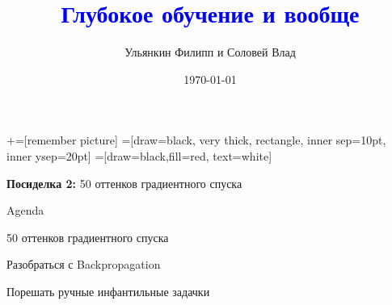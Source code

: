 \documentclass[notes,12pt, aspectratio=169]{beamer}
\title[]{\textcolor{blue}{Глубокое обучение и вообще}}
\author{Ульянкин Филипп и Соловей Влад}
\date{\today}
\newenvironment{wideitemize}{\itemize\addtolength{\itemsep}{10pt}}{\enditemize}
\begin{document}
\newcommand\marktopleft[1]{%
    \tikz[overlay,remember picture] 
        \node (marker-#1-a) at (-.3em,.3em) {};%
}
\newcommand\markbottomright[2]{%
    \tikz[overlay,remember picture] 
        \node (marker-#1-b) at (0em,0em) {};%
}
+=[remember picture] 
 =[draw=black, very thick, rectangle, inner sep=10pt, inner ysep=20pt]
 =[draw=black,fill=red, text=white]


\begin{frame}
\maketitle
\centering \textbf{\color{blue} Посиделка 2:}  50 оттенков градиентного спуска
\end{frame}

\begin{frame}{Agenda}
\begin{wideitemize}
	
	\item 50 оттенков градиентного спуска
	
	\item Разобраться с Backpropagation 
	
	\item Порешать ручные инфантильные задачки
		
\end{wideitemize} 
\end{frame}
\end{document}
